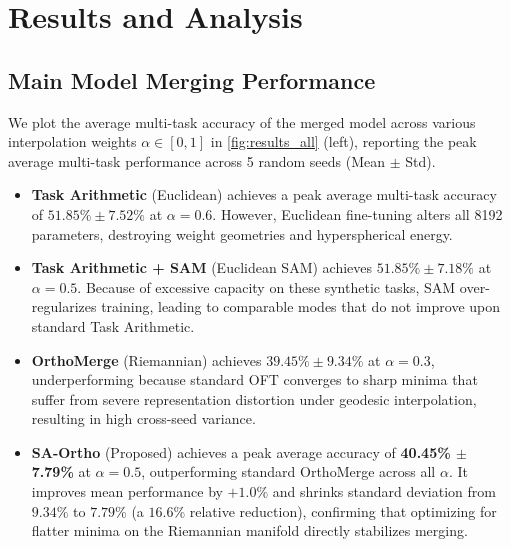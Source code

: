 \documentclass{article}
\theoremstyle{plain}
\theoremstyle{definition}
\theoremstyle{remark}
\begin{document}
\section{Results and Analysis}
\label{submission-results}

\subsection{Main Model Merging Performance}
We plot the average multi-task accuracy of the merged model across various interpolation weights $\alpha \in [0, 1]$ in \cref{fig:results_all} (left), reporting the peak average multi-task performance across 5 random seeds (Mean $\pm$ Std).
\begin{itemize}
  \item \textbf{Task Arithmetic} (Euclidean) achieves a peak average multi-task accuracy of $51.85\% \pm 7.52\%$ at $\alpha=0.6$. However, Euclidean fine-tuning alters all 8192 parameters, destroying weight geometries and hyperspherical energy.
  \item \textbf{Task Arithmetic + SAM} (Euclidean SAM) achieves $51.85\% \pm 7.18\%$ at $\alpha=0.5$. Because of excessive capacity on these synthetic tasks, SAM over-regularizes training, leading to comparable modes that do not improve upon standard Task Arithmetic.
  \item \textbf{OrthoMerge} (Riemannian) achieves $39.45\% \pm 9.34\%$ at $\alpha=0.3$, underperforming because standard OFT converges to sharp minima that suffer from severe representation distortion under geodesic interpolation, resulting in high cross-seed variance.
  \item \textbf{SA-Ortho} (Proposed) achieves a peak average accuracy of \textbf{40.45\% $\pm$ 7.79\%} at $\alpha=0.5$, outperforming standard OrthoMerge across all $\alpha$. It improves mean performance by $+1.0\%$ and shrinks standard deviation from $9.34\%$ to $7.79\%$ (a $16.6\%$ relative reduction), confirming that optimizing for flatter minima on the Riemannian manifold directly stabilizes merging.
\end{itemize}
\end{document}
